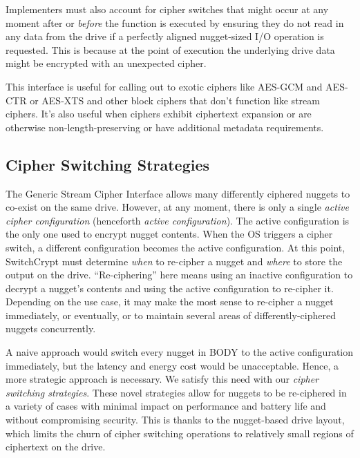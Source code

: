 \begin{enumerate}
   Implementers must also account for cipher switches that might occur at any
   moment after or \emph{before} the function is executed by ensuring they do
   not read in any data from the drive if a perfectly aligned nugget-sized I/O
   operation is requested. This is because at the point of execution the
   underlying drive data might be encrypted with an unexpected cipher.

   This interface is useful for calling out to exotic ciphers like AES-GCM and
   AES-CTR or AES-XTS and other block ciphers that don't function like stream
   ciphers. It's also useful when ciphers exhibit ciphertext expansion or are
   otherwise non-length-preserving or have additional metadata requirements.
\end{enumerate}

\subsection{Cipher Switching Strategies} \label{subsec:strategies}

The Generic Stream Cipher Interface allows many differently ciphered nuggets to
co-exist on the same drive. However, at any moment, there is only a single
\emph{active cipher configuration} (henceforth \emph{active configuration}). The
active configuration is the only one used to encrypt nugget contents. When the
OS triggers a cipher switch, a different configuration becomes the active
configuration. At this point, SwitchCrypt must determine \emph{when} to
re-cipher a nugget and \emph{where} to store the output on the drive.
``Re-ciphering'' here means using an inactive configuration to decrypt a
nugget's contents and using the active configuration to re-cipher it. Depending
on the use case, it may make the most sense to re-cipher a nugget immediately,
or eventually, or to maintain several areas of differently-ciphered nuggets
concurrently.

A naive approach would switch every nugget in BODY to the active configuration
immediately, but the latency and energy cost would be unacceptable. Hence, a
more strategic approach is necessary. We satisfy this need with our \emph{cipher
switching strategies}. These novel strategies allow for nuggets to be
re-ciphered in a variety of cases with minimal impact on performance and battery
life and without compromising security. This is thanks to the nugget-based drive
layout, which limits the churn of cipher switching operations to relatively
small regions of ciphertext on the drive.

